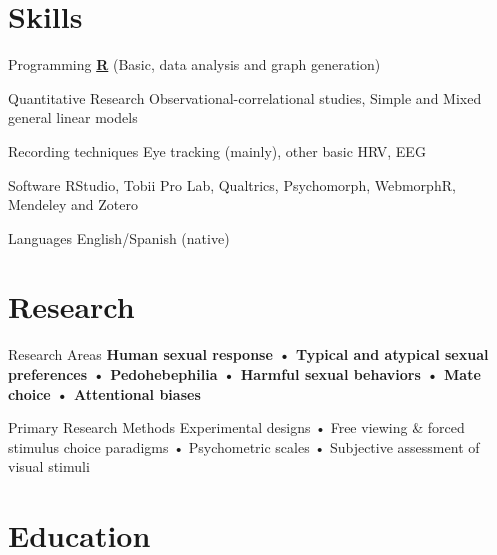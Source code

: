 \documentclass[11pt,a4paper,]{awesome-cv}
\begin{document}
\section{Skills}\label{skills}

\begin{cvskills}
  \cvskill
    {Programming}
    {\href{https://www.r-project.org/}{\textbf{R}} (Basic, data analysis and graph generation)}

  \cvskill
    {Quantitative Research}
    {Observational-correlational studies, Simple and Mixed general linear models}
  
  \cvskill
    {Recording techniques}
    {Eye tracking (mainly), other basic HRV, EEG}

  \cvskill
    {Software}
    {RStudio, Tobii Pro Lab, Qualtrics, Psychomorph, WebmorphR, Mendeley and Zotero}

  \cvskill
    {Languages}
    {English/Spanish (native)}
\end{cvskills}

\section{Research}\label{research}

\begin{cvskills}
  \cvskill
    {Research Areas}
    {\textbf{Human sexual response • Typical and atypical sexual preferences • Pedohebephilia • Harmful sexual \newline behaviors • Mate choice • Attentional biases}}

  \cvskill
    {Primary Research Methods}
    {Experimental designs • Free viewing \& forced stimulus choice paradigms • Psychometric scales • Subjective \newline assessment of visual stimuli}
\end{cvskills}

\section{Education}\label{education}
\end{document}
